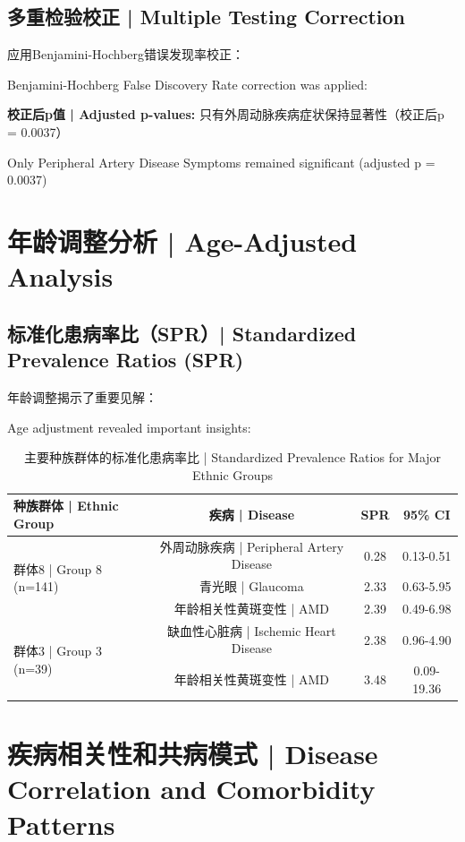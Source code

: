 \documentclass[12pt,a4paper]{article}
\begin{document}
\subsection{多重检验校正 | Multiple Testing Correction}

应用Benjamini-Hochberg错误发现率校正：

Benjamini-Hochberg False Discovery Rate correction was applied:

\colorbox{cyan!20}{\parbox{\textwidth}{
\textbf{校正后p值 | Adjusted p-values:} 只有外周动脉疾病症状保持显著性（校正后p = 0.0037）

Only Peripheral Artery Disease Symptoms remained significant (adjusted p = 0.0037)
}}

\section{年龄调整分析 | Age-Adjusted Analysis}

\subsection{标准化患病率比（SPR）| Standardized Prevalence Ratios (SPR)}

年龄调整揭示了重要见解：

Age adjustment revealed important insights:

\begin{table}[H]
\centering
\caption{主要种族群体的标准化患病率比 | Standardized Prevalence Ratios for Major Ethnic Groups}
\begin{tabular}{@{}lccc@{}}
\toprule
\textbf{种族群体 | Ethnic Group} & \textbf{疾病 | Disease} & \textbf{SPR} & \textbf{95\% CI} \\
\midrule
\multirow{3}{*}{群体8 | Group 8 (n=141)} & 外周动脉疾病 | Peripheral Artery Disease & 0.28 & 0.13-0.51 \\
& 青光眼 | Glaucoma & 2.33 & 0.63-5.95 \\
& 年龄相关性黄斑变性 | AMD & 2.39 & 0.49-6.98 \\
\midrule
\multirow{2}{*}{群体3 | Group 3 (n=39)} & 缺血性心脏病 | Ischemic Heart Disease & 2.38 & 0.96-4.90 \\
& 年龄相关性黄斑变性 | AMD & 3.48 & 0.09-19.36 \\
\bottomrule
\end{tabular}
\end{table}

\section{疾病相关性和共病模式 | Disease Correlation and Comorbidity Patterns}
\end{document}
